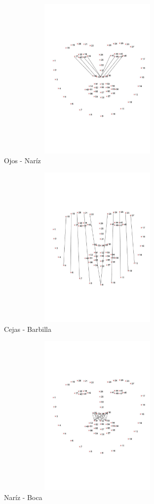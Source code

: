 \documentclass{article}
\begin{document}
\begin{figure}[H]
  \centering
  \includegraphics[width=100mm, height=80mm]{images/cheekbone_distances.jpg}
  \caption{Ojos - Naríz}
\end{figure}


\begin{figure}[H]
  \centering
  \includegraphics[width=100mm, height=80mm]{images/height_distances.jpg}
  \caption{Cejas - Barbilla}
\end{figure}


\begin{figure}[H]
  \centering
  \includegraphics[width=100mm, height=80mm]{images/moustache_distances.jpg}
  \caption{Naríz - Boca}
\end{figure}  
  
\end{document}
